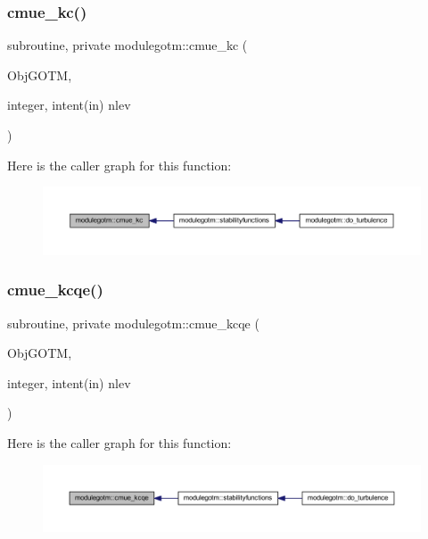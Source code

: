 \subsubsection{\texorpdfstring{cmue\+\_\+kc()}{cmue\_kc()}}
{\footnotesize\ttfamily subroutine, private modulegotm\+::cmue\+\_\+kc (\begin{DoxyParamCaption}\item[{}]{Obj\+G\+O\+TM,  }\item[{integer, intent(in)}]{nlev }\end{DoxyParamCaption})\hspace{0.3cm}{\ttfamily [private]}}

Here is the caller graph for this function\+:\nopagebreak
\begin{figure}[H]
\begin{center}
\leavevmode
\includegraphics[width=350pt]{namespacemodulegotm_a39841630271ec0cdc9e21a9bc1bfc289_icgraph}
\end{center}
\end{figure}
\mbox{\label{namespacemodulegotm_ab365e1ebbb95df9750427f6340cac165}} 
\subsubsection{\texorpdfstring{cmue\+\_\+kcqe()}{cmue\_kcqe()}}
{\footnotesize\ttfamily subroutine, private modulegotm\+::cmue\+\_\+kcqe (\begin{DoxyParamCaption}\item[{}]{Obj\+G\+O\+TM,  }\item[{integer, intent(in)}]{nlev }\end{DoxyParamCaption})\hspace{0.3cm}{\ttfamily [private]}}

Here is the caller graph for this function\+:\nopagebreak
\begin{figure}[H]
\begin{center}
\leavevmode
\includegraphics[width=350pt]{namespacemodulegotm_ab365e1ebbb95df9750427f6340cac165_icgraph}
\end{center}
\end{figure}
\mbox{\label{namespacemodulegotm_a35d3226a2d10d64e249360320b18c8a4}} 
